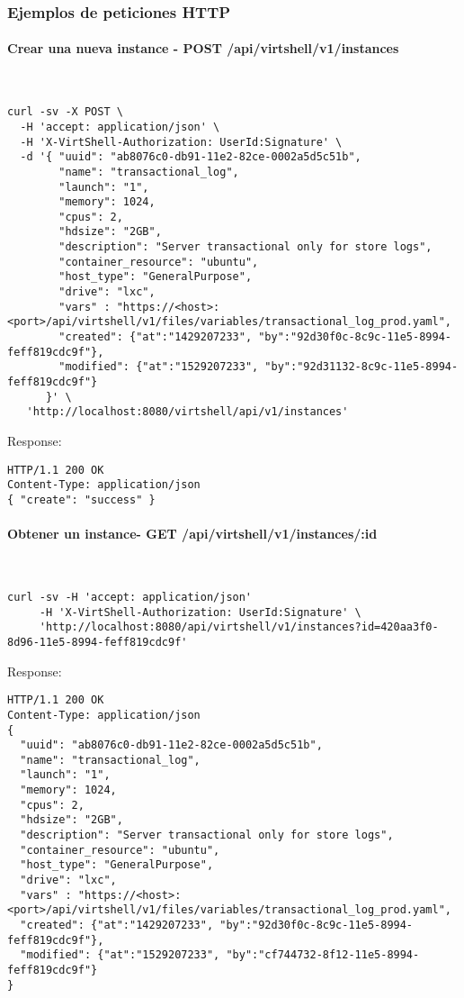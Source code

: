 \subsubsection{Ejemplos de peticiones HTTP}

\paragraph{Crear una nueva instance - POST /api/virtshell/v1/instances} ~\\


\begin{lstlisting}[style=json]
curl -sv -X POST \
  -H 'accept: application/json' \
  -H 'X-VirtShell-Authorization: UserId:Signature' \
  -d '{ "uuid": "ab8076c0-db91-11e2-82ce-0002a5d5c51b",
        "name": "transactional_log",
        "launch": "1",
        "memory": 1024,
        "cpus": 2,
        "hdsize": "2GB",
        "description": "Server transactional only for store logs", 
        "container_resource": "ubuntu",
        "host_type": "GeneralPurpose",
        "drive": "lxc",
        "vars" : "https://<host>:<port>/api/virtshell/v1/files/variables/transactional_log_prod.yaml",
        "created": {"at":"1429207233", "by":"92d30f0c-8c9c-11e5-8994-feff819cdc9f"},
        "modified": {"at":"1529207233", "by":"92d31132-8c9c-11e5-8994-feff819cdc9f"}
      }' \
   'http://localhost:8080/virtshell/api/v1/instances'
\end{lstlisting}

Response:

\begin{lstlisting}[style=json]
HTTP/1.1 200 OK
Content-Type: application/json
{ "create": "success" }
\end{lstlisting}

\paragraph{Obtener un instance- GET /api/virtshell/v1/instances/:id} ~\\

\begin{lstlisting}[style=json]
curl -sv -H 'accept: application/json' 
     -H 'X-VirtShell-Authorization: UserId:Signature' \ 
     'http://localhost:8080/api/virtshell/v1/instances?id=420aa3f0-8d96-11e5-8994-feff819cdc9f'
\end{lstlisting}

Response:

\begin{lstlisting}[style=json]
HTTP/1.1 200 OK
Content-Type: application/json
{
  "uuid": "ab8076c0-db91-11e2-82ce-0002a5d5c51b",
  "name": "transactional_log",
  "launch": "1",
  "memory": 1024,
  "cpus": 2,
  "hdsize": "2GB",
  "description": "Server transactional only for store logs", 
  "container_resource": "ubuntu",
  "host_type": "GeneralPurpose",
  "drive": "lxc",
  "vars" : "https://<host>:<port>/api/virtshell/v1/files/variables/transactional_log_prod.yaml",
  "created": {"at":"1429207233", "by":"92d30f0c-8c9c-11e5-8994-feff819cdc9f"},
  "modified": {"at":"1529207233", "by":"cf744732-8f12-11e5-8994-feff819cdc9f"}
}
\end{lstlisting}


